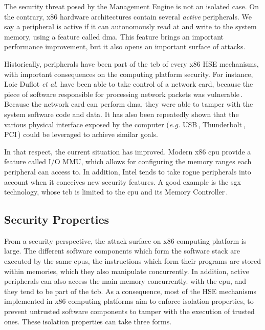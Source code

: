 The security threat posed by the Management Engine is not an isolated case.
%
On the contrary, x86 hardware architectures contain several \emph{active}
peripherals.
%
We say a peripheral is active if it can autonomously read at and write to the
system memory, using a feature called \ac{dma}.
%
This feature brings an important performance improvement, but it also opens an
important surface of attacks.

Historically, peripherals have been part of the \ac{tcb} of every x86 HSE
mechanisms, with important consequences on the computing platform security.
%
For instance, Loic Duflot \emph{et al.} have been able to take control of a
network card, because the piece of software responsible for processing network
packets was vulnerable\,\cite{duflot2010network}.
%
Because the network card can perform \ac{dma}, they were able to tamper with the
system software code and data.
%
It has also been repeatedly shown that the various physical interface exposed by
the computer (\emph{e.g.} USB\,\cite{nohl2014badusb},
Thunderbolt\,\cite{hudson2015thunderstrike}, PCI\,\cite{chifflier2013uefi})
could be leveraged to achieve similar goals.

In that respect, the current situation has improved.
%
Modern x86 \acs{cpu} provide a feature called I/O MMU, which allows for
configuring the memory ranges each peripheral can access to.
%
In addition, Intel tends to take rogue peripherals into account when it
conceives new security features.
%
A good example is the \ac{sgx} technology, whose \ac{tcb} is limited to the
\ac{cpu} and its Memory Controller\,\cite{costan2016sgxexplained}.

\subsection{Security Properties}

From a security perspective, the attack surface on x86 computing platform is
large.
%
The different software components which form the software stack are executed by
the same \acp{cpu}, the instructions which form their programs are stored within
memories, which they also manipulate concurrently.
%
In addition, active peripherals can also access the main memory concurrently.
with the \ac{cpu}, and they tend to be part of the \ac{tcb}.
%
As a consequence, most of the HSE mechanisms implemented in x86 computing
platforms aim to enforce isolation properties, to prevent untrusted software
components to tamper with the execution of trusted ones.
%
These isolation properties can take three forms.

